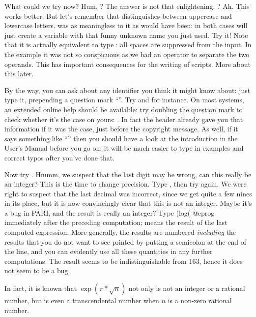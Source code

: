 What could we try now? Hum, ? The answer is not that
enlightening. ? Ah. This works better. But let's remember that
 distinguishes between uppercase and lowercase letters.  was
as meaningless to it as  would have been: in both cases
 will just create a variable with that funny unknown name you just
used. Try it! Note that it is actually equivalent to type
: all spaces are suppressed from the input. In the
 example  it was not so conspicuous as we had an operator to
separate the two operands. This has important consequences for the writing of
 scripts. More about this later.

By the way, you can ask  about any identifier you think it might know
about: just type it, prepending a question mark ``''. Try 
and  for instance. On most systems, an extended online help should
be available: try doubling the question mark to check whether it's the case
on yours: . In fact the  header already gave you that
information if it was the case, just before the copyright message. As well,
if it says something like ``'' then you should have a
look at the  introduction in the User's Manual before you go
on: it will be much easier to type in examples and correct typos after you've
done that.

Now try . Hmmm, we suspect that the last digit may
be wrong, can this really be an integer? This is the time to change
precision. Type , then try  again. We
were right to suspect that the last decimal was incorrect, since we get quite
a few nines in its place, but it is now convincingly clear that this is not
an integer. Maybe it's a bug in PARI, and the result is really an integer?
Type
\bprog
  (log(%
@eprog\noindent
immediately after the preceding computation; \kbd{\%} means the result of the
last computed expression. More generally, the results are numbered  \emph{including} the results
that you do not want to see printed by putting a semicolon at the end of the
line, and you can evidently use all these quantities in any further
computations. The result seems to be indistinguishable from $163$, hence it
does not seem to be a bug.

In fact, it is known that $\exp(\pi*\sqrt{n})$ not only is not an integer or
a rational number, but is even a transcendental number when $n$ is a non-zero
rational number.

